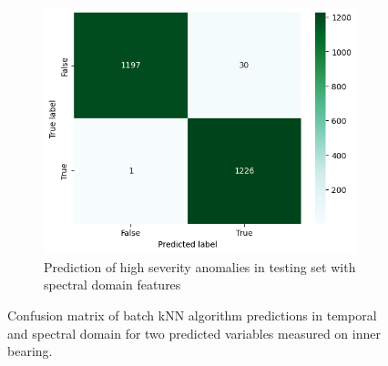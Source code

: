 \begin{figure}[ht]
    \begin{subfigure}[b]{0.49\textwidth}
        \includegraphics[width=\textwidth]{assets/design/kNN-spectral-confusion-matrix-anomaly90.png}
        \caption{Prediction of high severity anomalies in testing set with spectral domain features}
    \end{subfigure}
    \caption{Confusion matrix of batch kNN algorithm predictions in temporal and spectral domain for two predicted variables measured on inner bearing.}
\end{figure}


